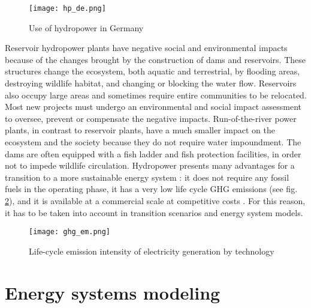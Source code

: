 \begin{figure}[H]
\centering
\texttt{[image: hp\_de.png]}
\caption[Use of hydropower in Germany]{Use of hydropower in Germany \cite{bdew}}
\label{hp_de}
\end{figure}

Reservoir hydropower plants have negative social and environmental impacts because of the changes brought by the construction of dams and reservoirs. These structures change the ecosystem, both aquatic and terrestrial, by flooding areas, destroying wildlife habitat, and changing or blocking the water flow. Reservoirs also occupy large areas and sometimes require entire communities to be relocated. Most new projects must undergo an environmental and social impact assessment to oversee, prevent or compensate the negative impacts. Run-of-the-river power plants, in contrast to reservoir plants, have a much smaller impact on the ecosystem and the society because they do not require water impoundment. The dams are often equipped with a fish ladder and fish protection facilities, in order not to impede wildlife circulation. \newline 
Hydropower presents many advantages for a transition to a more sustainable energy system : it does not require any fossil fuels in the operating phase, it has a very low life cycle GHG emissions (see fig. \ref{ghg_em}), and it is available at a commercial scale at competitive costs \cite{hp_europe}. For this reason, it has to be taken into account in transition scenarios and energy system models. 

\begin{figure}[H]
\centering
\texttt{[image: ghg\_em.png]}
\caption[Life-cycle emission intensity of electricity generation by technology]{Life-cycle emission intensity of electricity generation by technology \cite{hp_europe}}
\label{ghg_em}
\end{figure}


\section{Energy systems modeling}

